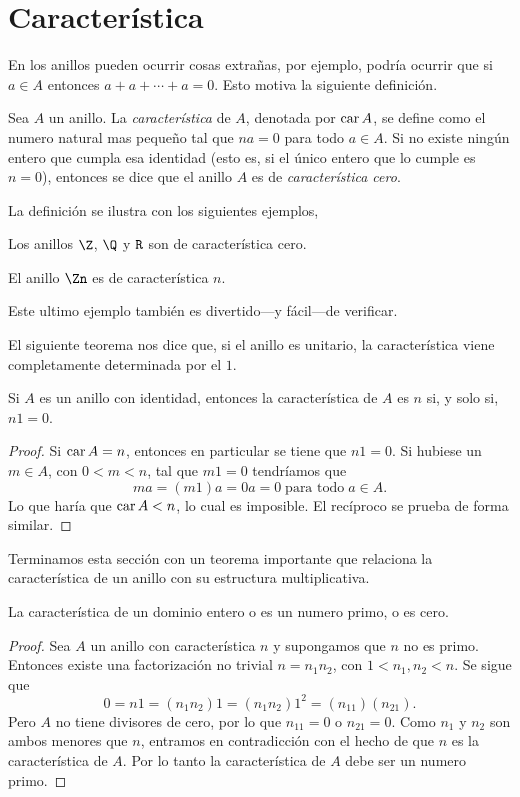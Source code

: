 \section{Característica}
\noindent En los anillos pueden ocurrir cosas extrañas, por ejemplo, podría ocurrir que si $a\in A$ entonces $a+a+\cdots+a = 0$. Esto motiva la siguiente definición. 
\begin{defi} 
	Sea $A$ un anillo. La \textit{característica} de $A$, denotada por $\operatorname{car} A$, se define como el numero natural mas pequeño tal que $na=0$ para todo $a \in A$. Si no existe ningún entero que cumpla esa identidad (esto es, si el único entero que lo cumple es $n=0$), entonces se dice que el anillo $A$ es de \textit{característica cero}.
\end{defi}
%
La definición se ilustra con los siguientes ejemplos, 
\begin{ejem} 
	Los anillos $\Z$, $\Q$ y $\texttt{R}$ son de característica cero.
\end{ejem} 
\begin{ejem} 
	El anillo $\Zn$ es de característica $n$.
\end{ejem}
\begin{nota}
	Este ultimo ejemplo también es divertido---y fácil---de verificar.
\end{nota}
El siguiente teorema nos dice que, si el anillo es unitario, la característica viene completamente determinada por el $1$. 
\begin{teo}  
	Si $A$ es un anillo con identidad, entonces la característica de $A$ es $n$ si, y solo si, $n1=0$.
\end{teo}
\begin{proof}
	Si $\operatorname{car} A = n$, entonces en particular se tiene que $n1=0$. Si hubiese un $m\in A$, con $0<m<n$, tal que $m1=0$ tendríamos que
	\[ ma = (m1)a = 0a = 0 \; \text{para todo} \; a \in A. \]
	Lo que haría que $\operatorname{car} A < n$, lo cual es imposible. El recíproco se prueba de forma similar.
\end{proof}
%
Terminamos esta sección con un teorema importante que relaciona la característica de un anillo con su estructura multiplicativa.
\begin{teo}  
	La característica de un dominio entero o es un numero primo, o es cero.
\end{teo}
\begin{proof}
	Sea $A$ un anillo con característica $n$ y supongamos que $n$ no es primo. Entonces existe una factorización no trivial $n=n_1n_2$, con $1<n_1,n_2<n$. Se sigue que
	\[ 0 = n1 = (n_1n_2)1 = (n_1n_2)1^2 = (n_11)(n_21). \]
	Pero $A$ no tiene divisores de cero, por lo que $n_11 = 0$ o $n_21 = 0$. Como $n_1$ y $n_2$ son ambos menores que $n$, entramos en contradicción con el hecho de que $n$ es la característica de $A$. Por lo tanto la característica de $A$ debe ser un numero primo.
\end{proof}
